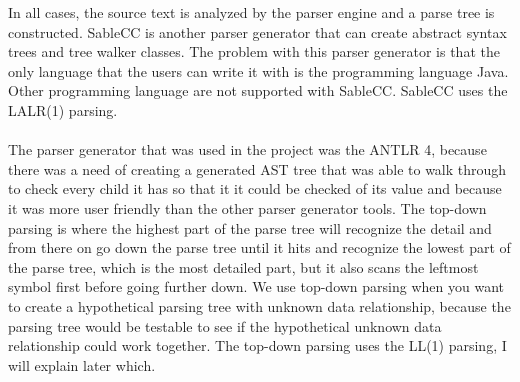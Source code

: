 In all cases, the source text is analyzed by the parser engine and a parse tree is constructed.
SableCC is another parser generator that can create abstract syntax trees and tree walker classes. The problem with this parser generator is that the only language that the users can write it with is the programming language Java. Other programming language are not supported with SableCC. SableCC uses the LALR(1) parsing\cite{SableCC}.\\
\\
The parser generator that was used in the project was the ANTLR 4, because there was a need of creating a generated AST tree that was able to walk through to check every child it has so that it it could be checked of its value and because it was more user friendly than the other parser generator tools. 
The top-down parsing is where the highest part of the parse tree will recognize the detail and from there on go down the parse tree until it hits and recognize the lowest part of the parse tree, which is the most detailed part, but it also scans the leftmost symbol first before going further down. We use top-down parsing when you want to create a hypothetical parsing tree with unknown data relationship, because the parsing tree would be testable to see if the hypothetical unknown data relationship could work together. The top-down parsing uses the LL(1) parsing, I will explain later which.